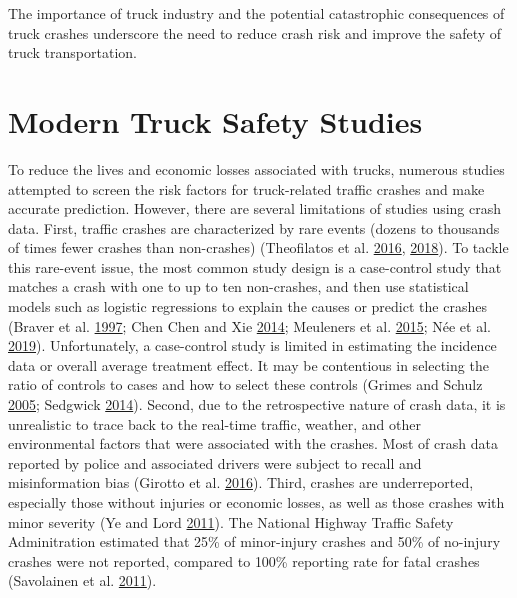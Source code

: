 \documentclass[12pt]{book}
\numberwithin{equation}{chapter}
\begin{document}
The importance of truck industry and the potential catastrophic consequences of truck crashes underscore the need to reduce crash risk and improve the safety of truck transportation.

\hypertarget{modern-truck-safety-studies}{%
\section{Modern Truck Safety Studies}\label{modern-truck-safety-studies}}

To reduce the lives and economic losses associated with trucks, numerous studies attempted to screen the risk factors for truck-related traffic crashes and make accurate prediction. However, there are several limitations of studies using crash data. First, traffic crashes are characterized by rare events (dozens to thousands of times fewer crashes than non-crashes) (Theofilatos et al. \protect\hyperlink{ref-theofilatos2016predicting}{2016}, \protect\hyperlink{ref-theofilatos2018impact}{2018}). To tackle this rare-event issue, the most common study design is a case-control study that matches a crash with one to up to ten non-crashes, and then use statistical models such as logistic regressions to explain the causes or predict the crashes (Braver et al. \protect\hyperlink{ref-braver1997tractor}{1997}; Chen Chen and Xie \protect\hyperlink{ref-chen2014modeling}{2014}; Meuleners et al. \protect\hyperlink{ref-meuleners2015obstructive}{2015}; Née et al. \protect\hyperlink{ref-nee2019road}{2019}). Unfortunately, a case-control study is limited in estimating the incidence data or overall average treatment effect. It may be contentious in selecting the ratio of controls to cases and how to select these controls (Grimes and Schulz \protect\hyperlink{ref-grimes2005compared}{2005}; Sedgwick \protect\hyperlink{ref-sedgwick2014case}{2014}). Second, due to the retrospective nature of crash data, it is unrealistic to trace back to the real-time traffic, weather, and other environmental factors that were associated with the crashes. Most of crash data reported by police and associated drivers were subject to recall and misinformation bias (Girotto et al. \protect\hyperlink{ref-girotto2016professional}{2016}). Third, crashes are underreported, especially those without injuries or economic losses, as well as those crashes with minor severity (Ye and Lord \protect\hyperlink{ref-ye2011investigation}{2011}). The National Highway Traffic Safety Adminitration estimated that 25\% of minor-injury crashes and 50\% of no-injury crashes were not reported, compared to 100\% reporting rate for fatal crashes (Savolainen et al. \protect\hyperlink{ref-savolainen2011statistical}{2011}).
\end{document}
